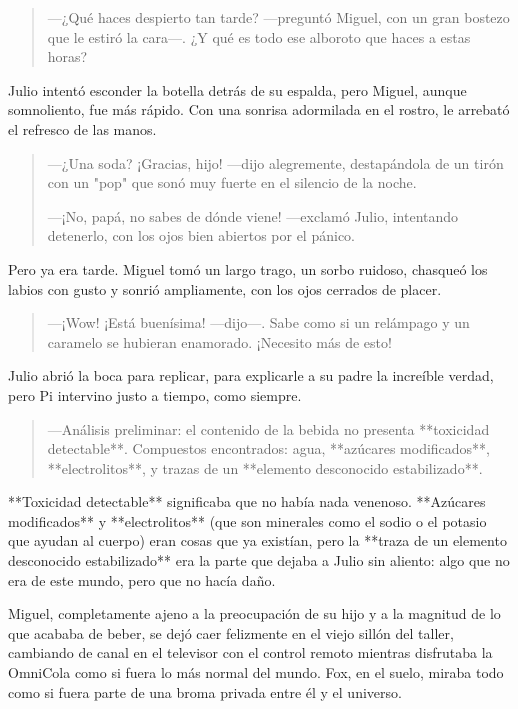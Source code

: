\documentclass[a4paper,12pt]{book}
\begin{document}
\begin{quote}
    —¿Qué haces despierto tan tarde? —preguntó Miguel, con un gran bostezo que le estiró la cara—. ¿Y qué es todo ese alboroto que haces a estas horas?
\end{quote}

Julio intentó esconder la botella detrás de su espalda, pero Miguel, aunque somnoliento, fue más rápido. Con una sonrisa adormilada en el rostro, le arrebató el refresco de las manos.

\begin{quote}
    —¿Una soda? ¡Gracias, hijo! —dijo alegremente, destapándola de un tirón con un "pop" que sonó muy fuerte en el silencio de la noche.

    —¡No, papá, no sabes de dónde viene! —exclamó Julio, intentando detenerlo, con los ojos bien abiertos por el pánico.
\end{quote}

Pero ya era tarde. Miguel tomó un largo trago, un sorbo ruidoso, chasqueó los labios con gusto y sonrió ampliamente, con los ojos cerrados de placer.

\begin{quote}
    —¡Wow! ¡Está buenísima! —dijo—. Sabe como si un relámpago y un caramelo se hubieran enamorado. ¡Necesito más de esto!
\end{quote}

Julio abrió la boca para replicar, para explicarle a su padre la increíble verdad, pero Pi intervino justo a tiempo, como siempre.

\begin{quote}
    —Análisis preliminar: el contenido de la bebida no presenta **toxicidad detectable**. Compuestos encontrados: agua, **azúcares modificados**, **electrolitos**, y trazas de un **elemento desconocido estabilizado**.
\end{quote}

**Toxicidad detectable** significaba que no había nada venenoso. **Azúcares modificados** y **electrolitos** (que son minerales como el sodio o el potasio que ayudan al cuerpo) eran cosas que ya existían, pero la **traza de un elemento desconocido estabilizado** era la parte que dejaba a Julio sin aliento: algo que no era de este mundo, pero que no hacía daño.

Miguel, completamente ajeno a la preocupación de su hijo y a la magnitud de lo que acababa de beber, se dejó caer felizmente en el viejo sillón del taller, cambiando de canal en el televisor con el control remoto mientras disfrutaba la OmniCola como si fuera lo más normal del mundo. Fox, en el suelo, miraba todo como si fuera parte de una broma privada entre él y el universo.
\end{document}
